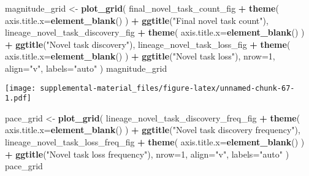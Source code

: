 \documentclass[]{book}
\newenvironment{Shaded}{\begin{snugshade}}{\end{snugshade}}
\newcommand{\DataTypeTok}[1]{\textcolor[rgb]{0.13,0.29,0.53}{#1}}
\newcommand{\DecValTok}[1]{\textcolor[rgb]{0.00,0.00,0.81}{#1}}
\newcommand{\KeywordTok}[1]{\textcolor[rgb]{0.13,0.29,0.53}{\textbf{#1}}}
\newcommand{\NormalTok}[1]{#1}
\newcommand{\OperatorTok}[1]{\textcolor[rgb]{0.81,0.36,0.00}{\textbf{#1}}}
\newcommand{\StringTok}[1]{\textcolor[rgb]{0.31,0.60,0.02}{#1}}
\begin{document}
\begin{Shaded}
\begin{Highlighting}[]
\NormalTok{magnitude_grid <-}\StringTok{ }\KeywordTok{plot_grid}\NormalTok{(}
\NormalTok{  final_novel_task_count_fig }\OperatorTok{+}
\StringTok{    }\KeywordTok{theme}\NormalTok{(}
      \DataTypeTok{axis.title.x=}\KeywordTok{element_blank}\NormalTok{()}
\NormalTok{    ) }\OperatorTok{+}
\StringTok{    }\KeywordTok{ggtitle}\NormalTok{(}\StringTok{"Final novel task count"}\NormalTok{),}
\NormalTok{  lineage_novel_task_discovery_fig }\OperatorTok{+}
\StringTok{    }\KeywordTok{theme}\NormalTok{(}
      \DataTypeTok{axis.title.x=}\KeywordTok{element_blank}\NormalTok{()}
\NormalTok{    ) }\OperatorTok{+}
\StringTok{    }\KeywordTok{ggtitle}\NormalTok{(}\StringTok{"Novel task discovery"}\NormalTok{),}
\NormalTok{  lineage_novel_task_loss_fig }\OperatorTok{+}
\StringTok{    }\KeywordTok{theme}\NormalTok{(}
      \DataTypeTok{axis.title.x=}\KeywordTok{element_blank}\NormalTok{()}
\NormalTok{    ) }\OperatorTok{+}
\StringTok{    }\KeywordTok{ggtitle}\NormalTok{(}\StringTok{"Novel task loss"}\NormalTok{),}
  \DataTypeTok{nrow=}\DecValTok{1}\NormalTok{,}
  \DataTypeTok{align=}\StringTok{"v"}\NormalTok{,}
  \DataTypeTok{labels=}\StringTok{"auto"}
\NormalTok{)}
\NormalTok{magnitude_grid}
\end{Highlighting}
\end{Shaded}

\texttt{[image: supplemental-material\_files/figure-latex/unnamed-chunk-67-1.pdf]}

\begin{Shaded}
\begin{Highlighting}[]
\NormalTok{pace_grid <-}\StringTok{ }\KeywordTok{plot_grid}\NormalTok{(}
\NormalTok{  lineage_novel_task_discovery_freq_fig }\OperatorTok{+}
\StringTok{    }\KeywordTok{theme}\NormalTok{(}
      \DataTypeTok{axis.title.x=}\KeywordTok{element_blank}\NormalTok{()}
\NormalTok{    ) }\OperatorTok{+}
\StringTok{    }\KeywordTok{ggtitle}\NormalTok{(}\StringTok{"Novel task discovery frequency"}\NormalTok{),}
\NormalTok{  lineage_novel_task_loss_freq_fig }\OperatorTok{+}
\StringTok{    }\KeywordTok{theme}\NormalTok{(}
      \DataTypeTok{axis.title.x=}\KeywordTok{element_blank}\NormalTok{()}
\NormalTok{    ) }\OperatorTok{+}
\StringTok{    }\KeywordTok{ggtitle}\NormalTok{(}\StringTok{"Novel task loss frequency"}\NormalTok{),}
  \DataTypeTok{nrow=}\DecValTok{1}\NormalTok{,}
  \DataTypeTok{align=}\StringTok{"v"}\NormalTok{,}
  \DataTypeTok{labels=}\StringTok{"auto"}
\NormalTok{)}
\NormalTok{pace_grid}
\end{Highlighting}
\end{Shaded}
\end{document}
